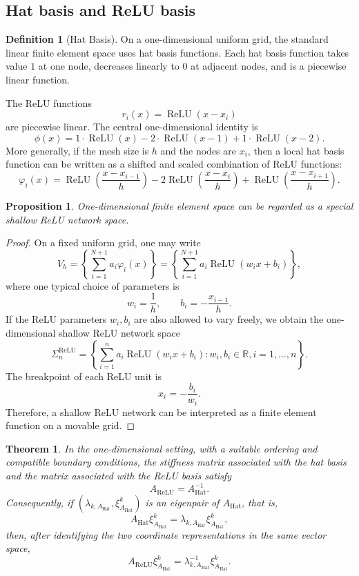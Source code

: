 \documentclass[11pt,a4paper]{article}
\newcommand{\R}{\mathbb{R}}
\newcommand{\ReLU}{\operatorname{ReLU}}
\newcommand{\Vh}{V_h}
\newcommand{\Ah}{A_{\mathrm{Hat}}}
\newcommand{\Ar}{A_{\mathrm{ReLU}}}
\theoremstyle{definition}
\newtheorem{definition}{Definition}[section]
\theoremstyle{plain}
\newtheorem{theorem}{Theorem}[section]
\theoremstyle{remark}
\theoremstyle{plain}
\newtheorem{proposition}{Proposition}[section]
\begin{document}
\subsection{Hat basis and ReLU basis}

\begin{definition}
    [Hat Basis] On a one-dimensional uniform grid, the standard linear finite element space uses hat basis functions. Each hat basis function takes value $1$ at one node, decreases linearly to $0$ at adjacent nodes, and is a piecewise linear function.
\end{definition}

The ReLU functions
\[
  r_i(x)=\ReLU(x-x_i)
\]
are piecewise linear. The central one-dimensional identity is
\[
  \phi(x)=1\cdot \ReLU(x)-2\cdot \ReLU(x-1)+1\cdot \ReLU(x-2).
\]
More generally, if the mesh size is $h$ and the nodes are $x_i$, then a local hat basis function can be written as a shifted and scaled combination of ReLU functions:
\[
  \varphi_i(x)
  =\ReLU\left(\frac{x-x_{i-1}}{h}\right)
  -2\ReLU\left(\frac{x-x_i}{h}\right)
  +\ReLU\left(\frac{x-x_{i+1}}{h}\right).
\]

\begin{proposition}
    One-dimensional finite element space can be regarded as a special shallow ReLU network space.
\end{proposition}
\begin{proof}
    On a fixed uniform grid, one may write
\[
  \Vh
  =\left\{\sum_{i=1}^{N+1} a_i\varphi_i(x)\right\}
  =\left\{\sum_{i=1}^{N+1} a_i\ReLU(w_i x+b_i)\right\},
\]
where one typical choice of parameters is
\[
  w_i=\frac{1}{h},
  \qquad
  b_i=-\frac{x_{i-1}}{h}.
\]
If the ReLU parameters $w_i,b_i$ are also allowed to vary freely, we obtain the one-dimensional shallow ReLU network space
\[
  \Sigma_n^{\ReLU}
  =\left\{
  \sum_{i=1}^n a_i\ReLU(w_ix+b_i):
  w_i,b_i\in\R,
  i=1,\ldots,n
  \right\}.
\]
The breakpoint of each ReLU unit is
\[
  x_i=-\frac{b_i}{w_i}.
\]
Therefore, a shallow ReLU network can be interpreted as a finite element function on a movable grid.


\end{proof}

\begin{theorem}
In the one-dimensional setting, with a suitable ordering and compatible boundary conditions, the stiffness matrix associated with the hat basis and the matrix associated with the ReLU basis satisfy
\[
  \Ar=\Ah^{-1}.
\]
Consequently, if $(\lambda_{k,\Ah},\xi_{\Ah}^k)$ is an eigenpair of $\Ah$, that is,
\[
  \Ah\xi_{\Ah}^k=\lambda_{k,\Ah}\xi_{\Ah}^k,
\]
then, after identifying the two coordinate representations in the same vector space,
\[
  \Ar\xi_{\Ah}^k=\lambda_{k,\Ah}^{-1}\xi_{\Ah}^k.
\]
\end{theorem}
\end{document}
